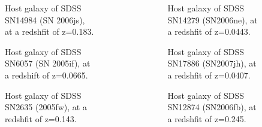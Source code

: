\documentclass[final]{beamer}
\newlength{\sepwid}
\newlength{\onecolwid}
\newlength{\twocolwid}
\begin{document}
\begin{frame}[t]
\begin{columns}[t]
\begin{column}{\twocolwid}
\begin{columns}
\begin{column}{\onecolwid}
\begin{figure}
    \centering
    \subfloat[SDSS, one pixel is 1,437 pc.]{%
        \texttt{[image: SDSS-SN14984.png]}
    }
\caption{Host galaxy of SDSS SN14984 (SN 2006js), at a redshfit of z=0.183.}
\end{figure}

\begin{figure}
    \centering
\caption{Host galaxy of SDSS SN6057 (SN 2005if), at a redshift of z=0.0665.}
\end{figure}

\begin{figure}
    \centering
    \subfloat[SDSS, one pixel is 1,135 pc.]{%
        \texttt{[image: SDSS-SN2635.png]}
    }
\caption{Host galaxy of SDSS SN2635 (2005fw), at a redshfit of z=0.143.}
\end{figure}
\end{column}

\begin{column}{\sepwid}\end{column}

\begin{column}{\onecolwid}
\begin{figure}
    \centering
    \subfloat[SDSS, one pixel is 359 pc.]{%
        \texttt{[image: SDSS-SN14279.png]}
    }
\caption{Host galaxy of SDSS SN14279 (SN2006ne), at a redshfit of z=0.0443.}
\end{figure}

\begin{figure}
    \centering
    \subfloat[SDSS, one pixel is 329 pc.]{%
        \texttt{[image: SDSS-SN17886.png]}
    }
\caption{Host galaxy of SDSS SN17886 (SN2007jh), at a redshfit of z=0.0407.}
\end{figure}

\begin{figure}
    \centering
    \subfloat[SDSS, one pixel is 1,898 pc.]{%
        \texttt{[image: SDSS-SN12874.png]}
    }
\caption{Host galaxy of SDSS SN12874 (SN2006fb), at a redshfit of z=0.245.}
\end{figure}
\end{column}
\end{columns}


\end{column}
\end{columns}
\end{frame}
\end{document}
